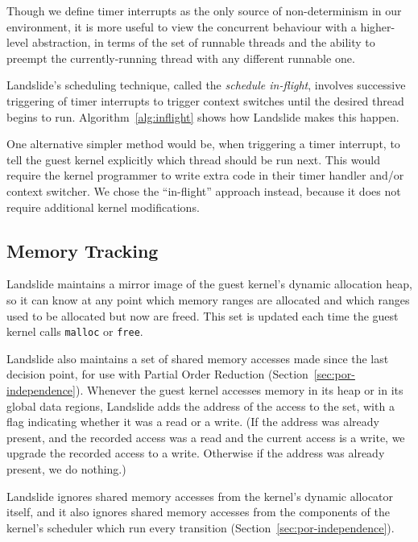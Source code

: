 Though we define timer interrupts as the only source of non-determinism in our environment, it is more useful to view the concurrent behaviour with a higher-level abstraction, in terms of the set of runnable threads and the ability to preempt the currently-running thread with any different runnable one.

Landslide's scheduling technique, called the {\em schedule in-flight}, involves successive triggering of timer interrupts to trigger context switches until the desired thread begins to run. Algorithm~\ref{alg:inflight} shows how Landslide makes this happen.

One alternative simpler method would be, when triggering a timer interrupt, to tell the guest kernel explicitly which thread should be run next. This would require the kernel programmer to write extra code in their timer handler and/or context switcher. We chose the ``in-flight'' approach instead, because it does not require additional kernel modifications.

\subsection{Memory Tracking}
\label{sec:components-memory}

Landslide maintains a mirror image of the guest kernel's dynamic allocation heap, so it can know at any point which memory ranges are allocated and which ranges used to be allocated but now are freed. This set is updated each time the guest kernel calls \texttt{malloc} or \texttt{free}.

Landslide also maintains a set of shared memory accesses made since the last decision point, for use with Partial Order Reduction (Section~\ref{sec:por-independence}). Whenever the guest kernel accesses memory in its heap or in its global data regions, Landslide adds the address of the access to the set, with a flag indicating whether it was a read or a write. (If the address was already present, and the recorded access was a read and the current access is a write, we upgrade the recorded access to a write. Otherwise if the address was already present, we do nothing.)

Landslide ignores shared memory accesses from the kernel's dynamic allocator itself, and it also ignores shared memory accesses from the components of the kernel's scheduler which run every transition (Section~\ref{sec:por-independence}).

